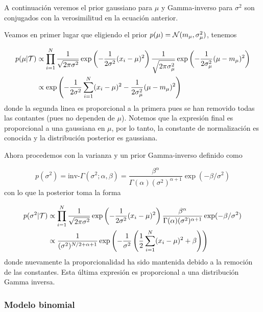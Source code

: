  A continuación veremos el prior gaussiano para $\mu$ y Gamma-inverso para $\sigma^2$ son conjugados con la verosimilitud en la ecuación anterior. 

 Veamos en primer lugar que eligiendo el prior $p(\mu) = {\mathcal N}(m_\mu,\sigma_\mu^2)$, tenemos 

 \begin{align}
 	p(\mu|{\mathcal T}) &\propto \prod_{i=1}^N \frac{1}{\sqrt{2\pi\sigma^2}}\exp\left(-\frac{1}{2\sigma^2}(x_i-\mu)^2\right) \frac{1}{\sqrt{2\pi\sigma_\mu^2}}\exp\left(-\frac{1}{2\sigma_\mu^2}(\mu-m_\mu)^2\right)\\
 	&\propto \exp\left(-\frac{1}{2\sigma^2}\sum_{i=1}^N(x_i-\mu)^2-\frac{1}{2\sigma_\mu^2}(\mu-m_\mu)^2\right)\nonumber
 \end{align} 
 donde la segunda linea es proporcional a la primera pues se han removido todas las contantes (pues no dependen de $\mu$). Notemos que la expresión final es proporcional a una gaussiana en $\mu$, por lo tanto, la constante de normalización es conocida y la distribución posterior es gaussiana.

 Ahora procedemos con la varianza y un prior Gamma-inverso definido como 

 \begin{equation}
 	p(\sigma^2)= \text{inv-}\Gamma(\sigma^2;\alpha,\beta) = \frac{\beta^\alpha}{\Gamma(\alpha) (\sigma^2)^{\alpha+1}}\exp(-\beta/\sigma^2)
 \end{equation}
 con lo que la posterior toma la forma 

 \begin{align}
 	p(\sigma^2|{\mathcal T}) &\propto \prod_{i=1}^N \frac{1}{\sqrt{2\pi\sigma^2}}\exp\left(-\frac{1}{2\sigma^2}(x_i-\mu)^2\right) \frac{\beta^\alpha}{\Gamma(\alpha) (\sigma^2)^{\alpha+1}}\exp(-\beta/\sigma^2)\\
 	&\propto  \frac{1}{(\sigma^2)^{N/2+\alpha+1}}\exp\left(-\frac{1}{\sigma^2}\left(\frac{1}{2}\sum_{i=1}^N(x_i-\mu)^2 +\beta\right) \right)\nonumber
 \end{align} 
 donde nuevamente la proporcionalidad ha sido mantenida debido a la remoción de las constantes. Esta última expresión es proporcional a una distribución Gamma inversa. 








\subsubsection{Modelo binomial}

